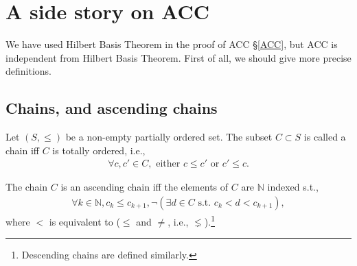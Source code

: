 \documentclass[11pt]{book}
\begin{document}
%


\section{A side story on ACC}
We have used Hilbert Basis Theorem in the proof of ACC \S\ref{ACC}, but ACC is independent from Hilbert Basis Theorem.
First of all, we should give more precise definitions.

\subsection{Chains, and ascending chains}
Let $(S, \leq)$ be a non-empty partially ordered set.
The subset $C \subset S$ is called a chain iff $C$ is totally ordered, i.e.,
\begin{eqnarray}
\forall c,c' \in C, \text{ either } c \leq c' \text{ or } c' \leq c.
\end{eqnarray}

The chain $C$ is an ascending chain iff the elements of $C$ are $\mathbb{N}$ indexed s.t.,
\begin{eqnarray}
\forall k \in \mathbb{N}, c_k \leq c_{k+1}, \lnot (\exists d \in C \text{ s.t. } c_k < d < c_{k+1}),
\end{eqnarray}
where $<$ is equivalent to ($\leq$ and $\neq$, i.e., $\lneq$).\footnote{Descending chains are defined similarly.}
\end{document}
